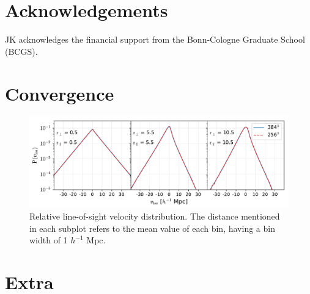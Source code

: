 \documentclass[a4paper,fleqn,usenatbib]{mnras}
\begin{document}
	
	\section*{Acknowledgements}
	
	JK acknowledges the financial support from the Bonn-Cologne
	Graduate School (BCGS).
	
	
	
	
	
	
	
	
	
	
	\appendix
	
	\section{Convergence}
	\label{app:conv}
	\begin{figure}
		\centering
		\includegraphics[scale=0.77]{rel_los_convergence}
		\caption{Relative line-of-sight velocity distribution. The distance mentioned in each subplot refers to the mean value of each bin, having a bin width of 1 $h^{-1}$ Mpc.}
		\label{fig:conv}
	\end{figure}
	
	\section{Extra}
	\label{app:extra}




\bsp	%
\label{lastpage}
\end{document}

